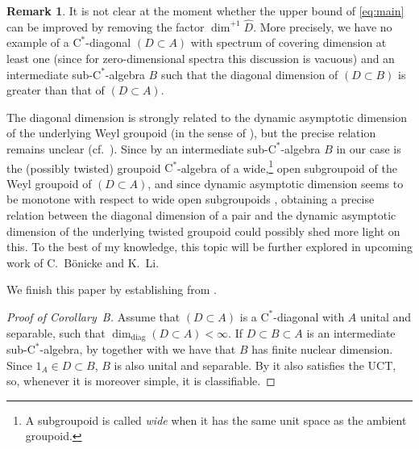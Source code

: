 \documentclass[11pt,a4paper]{amsart}
\theoremstyle{definition}
\newtheorem{remark}[theorem]{Remark}
\numberwithin{equation}{section}
\begin{document}
\begin{remark}\label{rmk:optimal}
It is not clear at the moment whether the upper bound of \eqref{eq:main} can be improved by removing the factor $\dim^{+1}\widehat{D}$. More precisely, we have no example of a $\mathrm{C}^\ast$-diagonal $(D\subset A)$ with spectrum of covering dimension at least one (since for zero-dimensional spectra this discussion is vacuous) and an intermediate sub-$\mathrm{C}^\ast$-algebra $B$ such that the diagonal dimension of $(D\subset B)$ is greater than that of $(D\subset A)$. 

The diagonal dimension is strongly related to the dynamic asymptotic dimension of the underlying Weyl groupoid (in the sense of \cite[Definition~4.2]{Ren08}), but the precise relation remains unclear (cf.\ \cite[Remarks~6.8 and 6.9, Question~6.11]{LiLiaWin23}). Since by \cite{BrownExelFullerPittsReznikoff21, BrownExelFullerPittsReznikoff21corrigendum} an intermediate sub-$\mathrm{C}^\ast$-algebra $B$ in our case is the (possibly twisted) groupoid $\mathrm{C}^\ast$-algebra of a wide,\footnote{A subgroupoid is called \emph{wide} when it has the same unit space as the ambient groupoid.} open subgroupoid of the Weyl groupoid of $(D\subset A)$, and since dynamic asymptotic dimension seems to be monotone with respect to wide open subgroupoids \cite{Bonicke24}, obtaining a precise relation between the diagonal dimension of a pair and the dynamic asymptotic dimension of the underlying twisted groupoid could possibly shed more light on this. To the best of my knowledge, this topic will be further explored in upcoming work of C.\ B{\"o}nicke and K.\ Li.
\end{remark}

We finish this paper by establishing  from .

\begin{proof}[Proof of Corollary~B]
Assume that $(D\subset A)$ is a $\mathrm{C}^\ast$-diagonal with $A$ unital and separable, such that $\dim_\mathrm{diag}(D\subset A)<\infty$. If $D\subset B\subset A$ is an intermediate sub-$\mathrm{C}^\ast$-algebra, by  together with \cite[Remarks~2.2~(i)]{LiLiaWin23} we have that $B$ has finite nuclear dimension. Since $1_A\in D\subset B$, $B$ is also unital and separable. By \cite{BarLi17} it also satisfies the UCT, so, whenever it is moreover simple, it is classifiable.
\end{proof}
\end{document}
